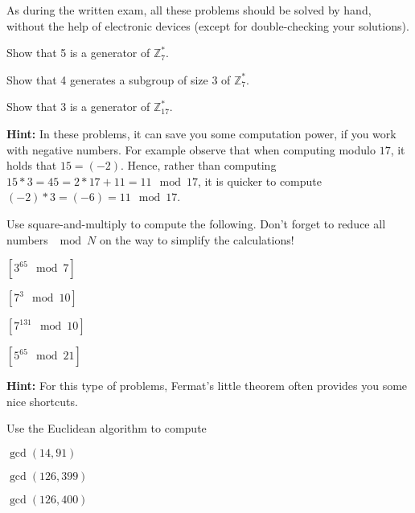 \documentclass[a4paper,10pt,landscape,twocolumn]{scrartcl}
\begin{document}
\problems

As during the written exam, all these problems should be solved by hand, without the help of electronic devices (except for double-checking your solutions).

\begin{exercise} 

\begin{subex} 
  Show that 5 is a generator of $\mathbb{Z}_7^*$.
\end{subex}
\begin{subex}
  Show that 4 generates a subgroup of size 3 of $\mathbb{Z}_7^*$.
\end{subex}
\begin{subex}
  Show that 3 is a generator of $\mathbb{Z}_{17}^*$.
\end{subex}

\textbf{Hint: } In these problems, it can save you some computation power, if you work with negative numbers. For example observe that when computing modulo $17$, it holds that $15 = (-2)$. Hence, rather than computing $15*3=45=2*17+11=11 \mod 17$, it is quicker to compute $(-2)*3=(-6)=11 \mod 17$.
\end{exercise}

\begin{exercise}  Use square-and-multiply to compute the following. Don't forget to reduce all numbers $\mod N$ on the way to simplify the calculations!
\begin{subex}
$[3^{65} \mod 7]$
\end{subex}
\begin{subex}
$[7^3 \mod 10]$
\end{subex}
\begin{subex}
$[7^{131} \mod 10]$
\end{subex}
\begin{subex}
$[5^{65} \mod 21]$
\end{subex}
\textbf{Hint: } For this type of problems, Fermat's little theorem often provides you some nice shortcuts.
\end{exercise}

\begin{exercise}  Use the Euclidean algorithm
  to compute
\begin{subex}
  $\gcd(14,91)$
\end{subex}
\begin{subex}
  $\gcd(126, 399)$
\end{subex}
\begin{subex}
  $\gcd(126,400)$
\end{subex}
\end{exercise}
\end{document}
